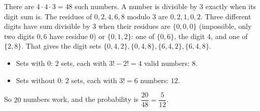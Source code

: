 There are $4\cdot4\cdot3=48$ such numbers. A number is divisible by $3$ exactly when its digit sum is. The residues of $0,2,4,6,8$ modulo $3$ are $0,2,1,0,2$. Three different digits have sum divisible by $3$ when their residues are $\{0,0,0\}$ (impossible, only two digits $0,6$ have residue $0$) or $\{0,1,2\}$: one of $\{0,6\}$, the digit $4$, and one of $\{2,8\}$. That gives the digit sets $\{0,4,2\},\{0,4,8\},\{6,4,2\},\{6,4,8\}$.
\begin{itemize}
\item Sets with $0$: $2$ sets, each with $3!-2!=4$ valid numbers: $8$.
\item Sets without $0$: $2$ sets, each with $3!=6$ numbers: $12$.
\end{itemize}
So $20$ numbers work, and the probability is $\dfrac{20}{48}=\boxed{\dfrac{5}{12}}$.
